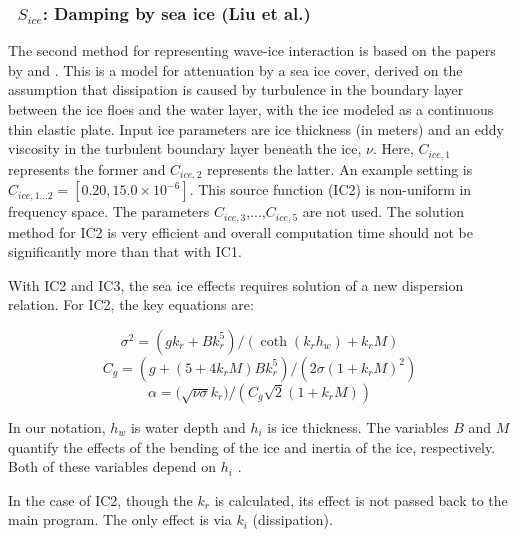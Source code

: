 \vsssub
\subsubsection{~$S_{ice}$: Damping by sea ice (Liu et al.)} \label{sec:ICE2}
\vsssub


\noindent
The second method for representing wave-ice interaction is based on the papers
by \cite{art:LMC88} and \cite{art:LHV91}. This is a model for attenuation by a
sea ice cover, derived on the assumption that dissipation is caused by
turbulence in the boundary layer between the ice floes and the water layer,
with the ice modeled as a continuous thin elastic plate. Input ice parameters
are ice thickness (in meters) and an eddy viscosity in the turbulent boundary
layer beneath the ice, ${\nu}$. Here, ${C_{ice,1}}$ represents the former and
${C_{ice,2}}$ represents the latter.  An example setting is 
${C_{ice,1...2}}=[0.20, 15.0\times 10^{-6}]$. This source function ({\code IC2}) is
non-uniform in frequency space. The parameters ${C_{ice,3}}$,...,${C_{ice,5}}$
are not used. The solution method for {\code IC2} is very efficient and 
overall computation time should not be significantly more than that with 
{\code IC1}.

With {\code IC2} and {\code IC3}, the sea ice effects requires solution of a
new dispersion relation. For {\code IC2}, the key equations are:

\begin{equation}\label{eq:ice1}
  {\sigma}^2 = ({gk_r} + {Bk_r^5})/(\coth({k_r}{h_w}) + {k_r}{M})
\end{equation}
\begin{equation}\label{eq:ice2}
  {C_g} = (g + (5 + 4{k_r}{M}){B}{k_r^5})/(2{\sigma}(1+{k_r}{M})^2)
\end{equation}
\begin{equation}\label{eq:ice3}
  {\alpha} = (\sqrt{{\nu\sigma}}{k_r)}/({C_g}\sqrt{2}(1+{k_r}{M}))
\end{equation}

\noindent
In our notation, $h_w$ is water depth and $h_i$ is ice thickness.  The
variables $B$ and $M$ quantify the effects of the bending of the ice and
inertia of the ice, respectively. Both of these variables depend on $h_i$ 
\citep[see][]{art:LMC88, art:LHV91}.

\vspace{\baselineskip} \noindent
In the case of {\code IC2}, though the ${k_r}$ is calculated, its effect is
not passed back to the main program. The only effect is via ${k_i}$
(dissipation).
